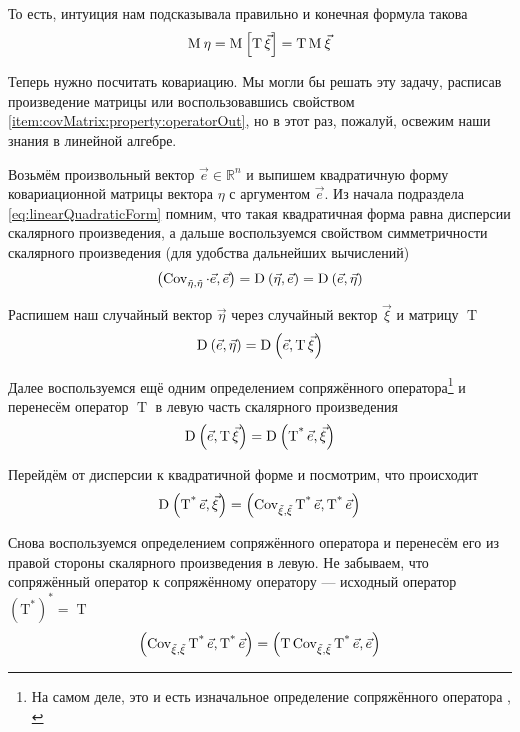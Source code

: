 То есть, интуиция нам подсказывала правильно и конечная формула такова
$$\operatorname{M}_{} \eta
  = \operatorname{M}_{} \left[ \operatorname{T} \vec{\xi}  \right]
  = \operatorname{T} \operatorname{M}_{} \vec{\xi} $$

Теперь нужно посчитать ковариацию. Мы могли бы решать эту задачу,
расписав произведение матрицы или воспользовавшись свойством
\ref{item:covMatrix:property:operatorOut}, но в этот раз, пожалуй, освежим
наши знания в линейной алгебре.

Возьмём произвольный вектор $\vec{e} \in \mathbb{R}^n$
и выпишем квадратичную форму ковариационной матрицы вектора $\eta$
с аргументом $\vec{e}$. Из начала подраздела \eqref{eq:linearQuadraticForm}
помним, что такая квадратичная форма равна дисперсии скалярного произведения, а
дальше воспользуемся свойством симметричности скалярного произведения
(для удобства дальнейших вычислений)
$$\left( \operatorname{Cov^{}_{\vec{\eta}, \vec{\eta}}} \cdot \vec{e}, \vec{e} \right)
  = \operatorname{D}_{} \left( \vec{\eta}, \vec{e} \right)
  = \operatorname{D}_{} \left( \vec{e}, \vec{\eta} \right)$$

Распишем наш случайный вектор $\vec{\eta}$ через случайный вектор $\vec{\xi}$
и матрицу $\operatorname{T}$
$$\operatorname{D}_{} \left( \vec{e}, \vec{\eta} \right)
  = \operatorname{D}_{} \left( \vec{e}, \operatorname{T} \vec{\xi} \right)$$

Далее воспользуемся ещё одним определением сопряжённого оператора\footnote{На
самом деле, это и есть изначальное определение сопряжённого оператора
\cite[с.~241]{VoevodinLA}, \cite[с.~126]{IlinPoznyarLA}}
и перенесём оператор $\operatorname{T}$ в левую часть скалярного произведения
$$\operatorname{D}_{} \left( \vec{e}, \operatorname{T} \vec{\xi} \right)
  = \operatorname{D}_{} \left( \operatorname{T^*} \vec{e} , \vec{\xi} \right)$$

Перейдём от дисперсии к квадратичной форме и посмотрим, что происходит
$$\operatorname{D}_{} \left( \operatorname{T^*} \vec{e} , \vec{\xi} \right)
  = \left( \operatorname{\operatorname{Cov^{}_{\vec{\xi}, \vec{\xi}}}} \operatorname{T^*} \vec{e} ,
      \operatorname{T^*} \vec{e} \right)$$

Снова воспользуемся определением сопряжённого оператора и перенесём его
из правой стороны скалярного произведения в левую. Не забываем, что
сопряжённый оператор к сопряжённому оператору --- исходный оператор
$\left( \operatorname{T^*} \right)^* = \operatorname{T}$
$$\left( \operatorname{\operatorname{Cov^{}_{\vec{\xi}, \vec{\xi}}}} \operatorname{T^*} \vec{e},
      \operatorname{T^*} \vec{e} \right)
  = \left( \operatorname{T} \operatorname{\operatorname{Cov^{}_{\vec{\xi}, \vec{\xi}}}} \operatorname{T^*}
      \vec{e}, \vec{e} \right)$$

